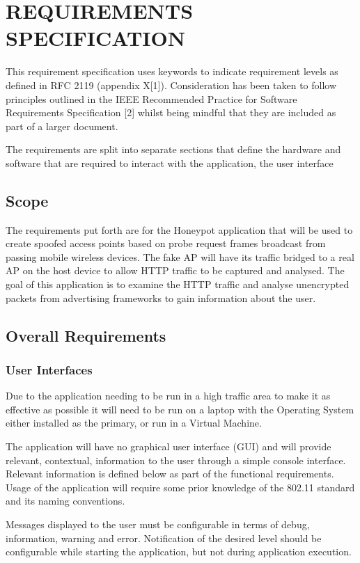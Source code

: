 \section{REQUIREMENTS SPECIFICATION}
This requirement specification uses keywords to indicate requirement levels as defined in RFC 2119 (appendix X[1]). Consideration has been taken to follow principles outlined in the IEEE Recommended Practice for Software Requirements Specification [2] whilst being mindful that they are included as part of a larger document.

The requirements are split into separate sections that define the hardware and software that are required to interact with the application, the user interface 

\subsection{Scope}
The requirements put forth are for the Honeypot application that will be used to create spoofed access points based on probe request frames broadcast from passing mobile wireless devices. The fake AP will have its traffic bridged to a real AP on the host device to allow HTTP traffic to be captured and analysed. The goal of this application is to examine the HTTP traffic and analyse unencrypted packets from advertising frameworks to gain information about the user.

\subsection{Overall Requirements}
\subsubsection{User Interfaces}
Due to the application needing to be run in a high traffic area to make it as effective as possible it will need to be run on a laptop with the Operating System either installed as the primary, or run in a Virtual Machine.

The application will have no graphical user interface (GUI) and will provide relevant, contextual, information to the user through a simple console interface. Relevant information is defined below as part of the functional requirements. Usage of the application will require some prior knowledge of the 802.11 standard and its naming conventions.

Messages displayed to the user must be configurable in terms of debug, information, warning and error. Notification of the desired level should be configurable while starting the application, but not during application execution.

